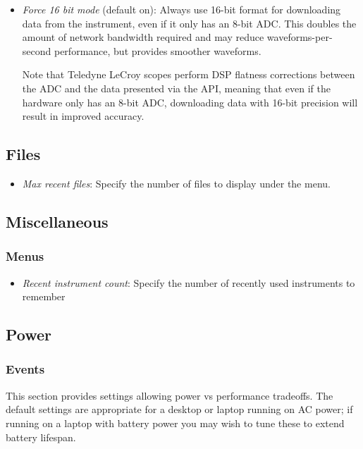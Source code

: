 \begin{itemize}
\item \emph{Force 16 bit mode} (default on): Always use 16-bit format for downloading data from the instrument, even if
it only has an 8-bit ADC. This doubles the amount of network bandwidth required and may reduce waveforms-per-second
performance, but provides smoother waveforms.

Note that Teledyne LeCroy scopes perform DSP flatness corrections between the ADC and the data presented via the API,
meaning that even if the hardware only has an 8-bit ADC, downloading data with 16-bit precision will result in improved
accuracy.

\end{itemize}

\subsection{Files}

\begin{itemize}
\item \emph{Max recent files}: Specify the number of files to display under the  menu.
\end{itemize}

\subsection{Miscellaneous}

\subsubsection{Menus}

\begin{itemize}
\item \emph{Recent instrument count}: Specify the number of recently used instruments to remember
\end{itemize}

\subsection{Power}

\subsubsection{Events}

This section provides settings allowing power vs performance tradeoffs. The default settings are appropriate for a
desktop or laptop running on AC power; if running on a laptop with battery power you may wish to tune these to extend
battery lifespan.

